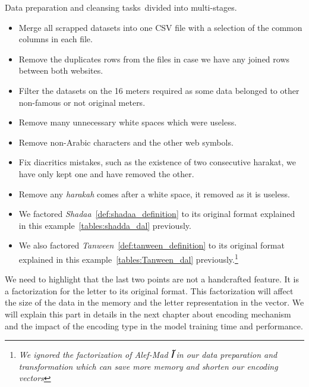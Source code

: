 Data preparation and cleansing tasks divided into multi-stages.
\begin{itemize}
\item Merge all scrapped datasets into one CSV file with a selection of the common columns in each file.
\item Remove the duplicates rows from the files in case we have any joined rows between both websites.
\item Filter the datasets on the 16 meters required as some data belonged to other non-famous or not original meters.
\item Remove many unnecessary white spaces which were useless.
\item Remove non-Arabic characters and the other web symbols.
\item Fix diacritics mistakes, such as the existence of two consecutive harakat, we have only kept one and have removed the other. %
\item Remove any \textit{harakah} comes after a white space, it removed as it is useless. %
\item We factored \textit{Shadaa}~\ref{def:shadaa_definition} to its original format explained in this example~\ref{tables:shadda_dal} previously.
\item We also factored \textit{Tanween}~\ref{def:tanween_definition} to its original format explained in this example~\ref{tables:Tanween_dal} previously.\footnote{\textit{We ignored the factorization of Alef-Mad  \textbf{\textarabic{ آ }} in our data preparation and transformation which can save more memory and shorten our encoding vectors}}
\end{itemize}

We need to highlight that the last two points are not a handcrafted feature. It is a factorization for the letter to its original format. This factorization will affect the size of the data in the memory and the letter representation in the vector. We will explain this part in details in the next chapter about encoding mechanism and the impact of the encoding type in the model training time and performance.







